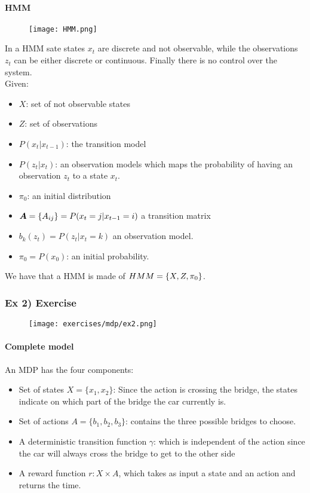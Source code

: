 \paragraph{HMM}
\begin{figure}[H]
    \centering
    \texttt{[image: HMM.png]}
\end{figure}

In a HMM sate states $x_t$ are discrete and not observable, while the observations $z_t$ can be either discrete or continuous. Finally there is no control over the system.\\
Given:
\begin{itemize}
\item $X$: set of not observable states
\item $Z$: set of observations
\item $P(x_t|x_{t-1})$: the transition model 
\item $P(z_t|x_t)$: an observation models which maps the probability of having an observation $z_t$ to a state $x_t$.
\item $\pi_0$: an initial distribution
\item $\bm{A}=\lbrace{A_{ij}}\rbrace=P(x_t=j|x_{t-1}=i)$ a transition matrix
\item $b_k(z_t)=P(z_t|x_t=k)$ an observation model.
\item $\pi_0=P(x_0)$: an initial probability.
\end{itemize}
We have that a HMM is made of $HMM=\lbrace{X,Z,\pi_0}\rbrace$.

\subsubsection{Ex 2) Exercise}

\begin{figure}[H]
    \centering
    \texttt{[image: exercises/mdp/ex2.png]}
\end{figure}

\paragraph{Complete model}
An MDP has the four components:
\begin{itemize}
\item Set of states $X=\{x_1,x_2\}$: Since the action is crossing the bridge, the states indicate on which part of the bridge the car currently is.
\item Set of actions $A=\{b_1,b_2,b_3\}$: contains the three possible bridges to choose.
\item A deterministic transition function $\gamma$: which is independent of the action since the car will always cross the bridge to get to the other side
\item A reward function $r: X\times A$, which takes as input a state and an action and returns the time. 
\end{itemize}




